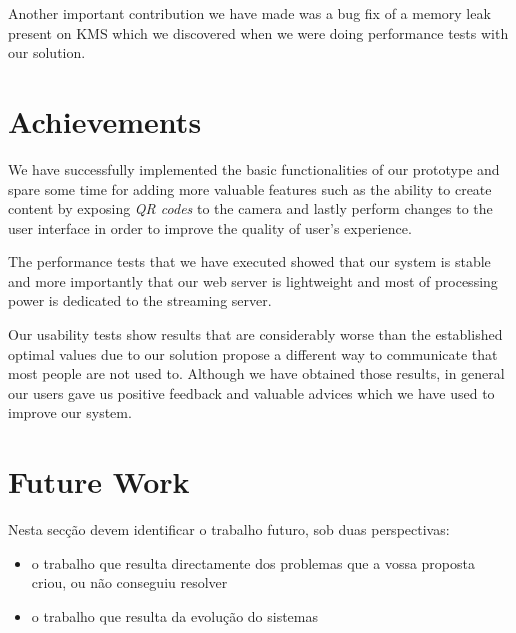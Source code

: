 Another important contribution we have made was a bug fix of a memory leak present on \ac{KMS} which we discovered when we were doing performance tests with our solution.

\section{Achievements}
\label{section:achievements}
	We have successfully implemented the basic functionalities of our prototype and spare some time for adding more valuable features such as the ability to create content by exposing \emph{QR codes} to the camera and lastly perform changes to the user interface in order to improve the quality of user's experience.

	The performance tests that we have executed showed that our system is stable and more importantly that our web server is lightweight and most of processing power is dedicated to the streaming server.

	Our usability tests show results that are considerably worse than the established optimal values due to our solution propose a different way to communicate that most people are not used to. Although we have obtained those results, in general our users gave us positive feedback and valuable advices which we have used to improve our system. 

\section{Future Work}
\label{section:future}
Nesta secção devem identificar o trabalho futuro, sob duas perspectivas:
\begin{itemize}
\item o trabalho que resulta directamente dos problemas que a vossa proposta criou, ou não conseguiu resolver
\item o trabalho que resulta da evolução do sistemas
\end{itemize}


\cleardoublepage
